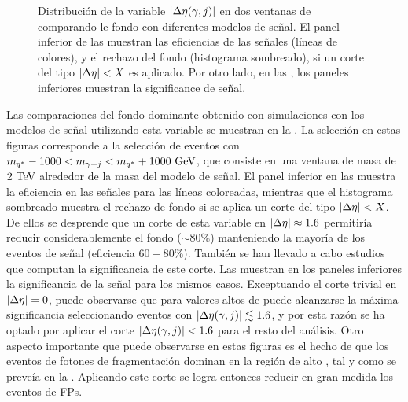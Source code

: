 \begin{figure}[ht!]
\begin{subfigure}[h]{0.49\linewidth}
    \end{subfigure}
    \caption{Distribución de la variable \(|\Delta\eta(\gamma, j)|\) en dos ventanas de \myj comparando le fondo con diferentes modelos de señal. El panel inferior de las \Figs{\ref{fig:evt_selection:sr_opt:eta:deta:1d:effrej_2000W}}{\ref{fig:evt_selection:sr_opt:eta:deta:1d:effrej_6000W}} muestran las eficiencias de las señales (líneas de colores), y el rechazo del fondo (histograma sombreado), si un corte del tipo \(|\Delta\eta| < X\) es aplicado. Por otro lado, en las \Figs{\ref{fig:evt_selection:sr_opt:eta:deta:1d:SB_2000W}}{\ref{fig:evt_selection:sr_opt:eta:deta:1d:SB_6000W}}, los paneles inferiores muestran la significance de señal.}
    \label{fig:evt_selection:sr_opt:eta:deta:1d}
\end{figure}

Las comparaciones del fondo dominante obtenido con simulaciones con los modelos de señal utilizando esta variable se muestran en la \Fig{\ref{fig:evt_selection:sr_opt:eta:deta:1d}}. La selección en estas figuras corresponde a la selección de eventos con \(m_{q^*} - 1000 < m_{\gamma+j} < m_{q^*} + 1000 ~\text{GeV}\), que consiste en una ventana de masa de \(2~\text{TeV}\) alrededor de la masa del modelo de señal.
El panel inferior en las \Figs{\ref{fig:evt_selection:sr_opt:eta:deta:1d:effrej_2000W}}{\ref{fig:evt_selection:sr_opt:eta:deta:1d:effrej_6000W}} muestra la eficiencia en las señales para las líneas coloreadas, mientras que el histograma sombreado muestra el rechazo de fondo si se aplica un corte del tipo \(|\Delta\eta| < X\). De ellos se desprende que un corte de esta variable en \(|\Delta\eta| \approx 1.6\) permitiría reducir considerablemente el fondo (\(\sim 80\%\)) manteniendo la mayoría de los eventos de señal (eficiencia \(60-80\%\)).
También se han llevado a cabo estudios que computan la significancia de este corte. Las \Figs{\ref{fig:evt_selection:sr_opt:eta:deta:1d:SB_2000W}}{\ref{fig:evt_selection:sr_opt:eta:deta:1d:SB_6000W}} muestran en los paneles inferiores la significancia de la señal para los mismos casos.
Exceptuando el corte trivial en \(|\Delta\eta| = 0\), puede observarse que para valores altos de \myj puede alcanzarse la máxima significancia seleccionando eventos con \(|\Delta\eta(\gamma, j)| \lesssim 1.6\), y por esta razón se ha optado por aplicar el corte \(|\Delta\eta(\gamma, j)| < 1.6\) para el resto del análisis.
Otro aspecto importante que puede observarse en estas figuras es el hecho de que los eventos de fotones de fragmentación dominan en la región de alto \Deta, tal y como se preveía en la \Fig{\ref{fig:evt_selection:sr_opt:eta:deta:2d:frag}}. Aplicando este corte se logra entonces reducir en gran medida los eventos de \acp{FP}.


